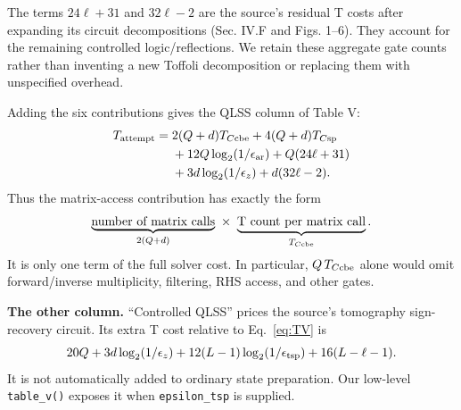 \documentclass[11pt]{article}
\begin{document}
The terms $24\ell+31$ and $32\ell-2$ are the source's residual T costs after expanding its circuit decompositions (Sec. IV.F and Figs. 1--6). They account for the remaining controlled logic/reflections. We retain these aggregate gate counts rather than inventing a new Toffoli decomposition or replacing them with unspecified overhead.

Adding the six contributions gives the QLSS column of Table V:
\begin{align}\label{eq:TV}
 T_{\rm attempt}={}&2(Q+d)T_{C\rm cbe}+4(Q+d)T_{C\rm sp}\nonumber\\
 &+12Q\log_2(1/\epsilon_{\rm ar})+Q(24\ell+31)\nonumber\\
 &+3d\log_2(1/\epsilon_z)+d(32\ell-2).
\end{align}
Thus the matrix-access contribution has exactly the form
\[
 \underbrace{\hbox{number of matrix calls}}_{2(Q+d)}
 \ \times\ 
 \underbrace{\hbox{T count per matrix call}}_{T_{C\rm cbe}}.
\]
It is only one term of the full solver cost. In particular, $Q\,T_{C\rm cbe}$ alone would omit forward/inverse multiplicity, filtering, RHS access, and other gates.

\textbf{The other column.} ``Controlled QLSS'' prices the source's tomography sign-recovery circuit. Its extra T cost relative to Eq.~\eqref{eq:TV} is
\[
 20Q+3d\log_2(1/\epsilon_z)
 +12(L-1)\log_2(1/\epsilon_{\rm tsp})+16(L-\ell-1).
\]
It is not automatically added to ordinary state preparation. Our low-level \texttt{table\_v()} exposes it when \texttt{epsilon\_tsp} is supplied.

\newpage
\end{document}
